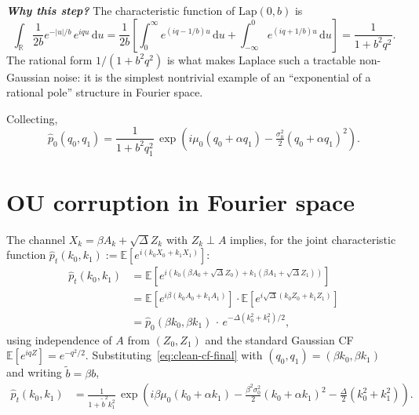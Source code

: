 \documentclass[11pt,a4paper,openany]{book}
\theoremstyle{plainserif}
\theoremstyle{definition}
\theoremstyle{remarkstyle}
\newenvironment{whybox}{%
  \begin{center}\begin{minipage}{0.95\linewidth}\small
  \textbf{\textit{Why this step?}}\quad\ignorespaces}{%
  \end{minipage}\end{center}}
\newcommand{\R}{\mathbb{R}}
\newcommand{\E}{\mathbb{E}}
\newcommand{\Lap}{\mathrm{Lap}}
\newcommand{\btilde}{\tilde{b}}
\newcommand{\hatfn}[1]{\widehat{#1}}
\begin{document}
\begin{whybox}
The characteristic function of $\Lap(0,b)$ is
\[
\int_\R \frac{1}{2b} e^{-|u|/b}\,e^{iqu}\,\mathrm{d}u
 = \frac{1}{2b}\left[ \int_0^\infty e^{(iq-1/b)u}\,\mathrm{d}u
                     + \int_{-\infty}^0 e^{(iq+1/b)u}\,\mathrm{d}u \right]
 = \frac{1}{1 + b^2 q^2}.
\]
The rational form $1/(1+b^2 q^2)$ is what makes Laplace such a
tractable non-Gaussian noise: it is the simplest nontrivial example
of an ``exponential of a rational pole'' structure in Fourier space.
\end{whybox}

Collecting,
\begin{equation}
\hatfn{p}_0(q_0, q_1) = \frac{1}{1 + b^2 q_1^2}\,
   \exp\!\left(i\mu_0 (q_0+\alpha q_1) - \tfrac{\sigma_0^2}{2}(q_0+\alpha q_1)^2\right).
\label{eq:clean-cf-final}
\end{equation}

\section{OU corruption in Fourier space}

The channel $X_k = \beta A_k + \sqrt{\Delta} Z_k$ with
$Z_k \perp A$ implies, for the joint characteristic function
$\hatfn{p}_t(k_0, k_1) := \E[e^{i(k_0 X_0 + k_1 X_1)}]$:
\begin{align}
\hatfn{p}_t(k_0,k_1)
 &= \E\!\left[ e^{i(k_0 (\beta A_0 + \sqrt{\Delta} Z_0) + k_1(\beta A_1 + \sqrt{\Delta}Z_1))}\right] \nonumber\\
 &= \E\!\left[ e^{i\beta(k_0 A_0 + k_1 A_1)}\right]\cdot
    \E\!\left[ e^{i\sqrt{\Delta}(k_0 Z_0 + k_1 Z_1)}\right] \nonumber\\
 &= \hatfn{p}_0(\beta k_0, \beta k_1)\,\cdot\, e^{-\Delta(k_0^2 + k_1^2)/2},
\label{eq:cf-OU-corrupt}
\end{align}
using independence of $A$ from $(Z_0, Z_1)$ and the standard Gaussian
CF $\E[e^{iqZ}] = e^{-q^2/2}$. Substituting~\eqref{eq:clean-cf-final}
with $(q_0,q_1) = (\beta k_0, \beta k_1)$ and writing
$\btilde = \beta b$,
\begin{align}
\hatfn{p}_t(k_0, k_1)
 &= \frac{1}{1+\btilde^2 k_1^2}\,
    \exp\!\left(i\beta\mu_0(k_0+\alpha k_1)
               - \tfrac{\beta^2\sigma_0^2}{2}(k_0+\alpha k_1)^2
               - \tfrac{\Delta}{2}(k_0^2+k_1^2)\right).
\label{eq:cf-Kone}
\end{align}
\end{document}

